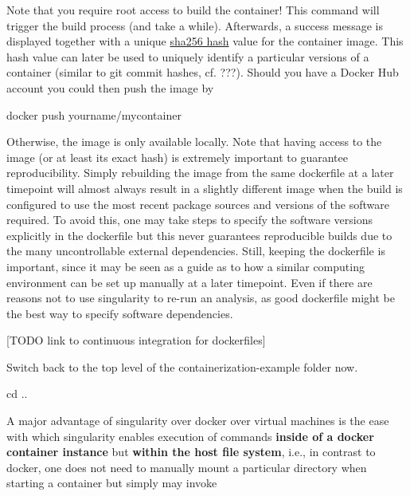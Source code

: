 \documentclass[]{book}
\newenvironment{Shaded}{\begin{snugshade}}{\end{snugshade}}
\newcommand{\BuiltInTok}[1]{#1}
\newcommand{\ExtensionTok}[1]{#1}
\newcommand{\NormalTok}[1]{#1}
\begin{document}
Note that you require root access to build the container! This command
will trigger the build process (and take a while). Afterwards, a success
message is displayed together with a unique
\href{https://en.wikipedia.org/wiki/SHA-2}{sha256 hash} value for the
container image. This hash value can later be used to uniquely identify
a particular versions of a container (similar to git commit hashes, cf.
???). Should you have a Docker Hub account you could then push the image
by

\begin{Shaded}
\begin{Highlighting}[]
\ExtensionTok{docker}\NormalTok{ push yourname/mycontainer}
\end{Highlighting}
\end{Shaded}

Otherwise, the image is only available locally. Note that having access
to the image (or at least its exact hash) is extremely important to
guarantee reproducibility. Simply rebuilding the image from the same
dockerfile at a later timepoint will almost always result in a slightly
different image when the build is configured to use the most recent
package sources and versions of the software required. To avoid this,
one may take steps to specify the software versions explicitly in the
dockerfile but this never guarantees reproducible builds due to the many
uncontrollable external dependencies. Still, keeping the dockerfile is
important, since it may be seen as a guide as to how a similar computing
environment can be set up manually at a later timepoint. Even if there
are reasons not to use singularity to re-run an analysis, as good
dockerfile might be the best way to specify software dependencies.

{[}TODO link to continuous integration for dockerfiles{]}

Switch back to the top level of the containerization-example folder now.

\begin{Shaded}
\begin{Highlighting}[]
\BuiltInTok{cd}\NormalTok{ ..}
\end{Highlighting}
\end{Shaded}

A major advantage of singularity over docker over virtual machines is
the ease with which singularity enables execution of commands
\textbf{inside of a docker container instance} but \textbf{within the
host file system}, i.e., in contrast to docker, one does not need to
manually mount a particular directory when starting a container but
simply may invoke
\end{document}
